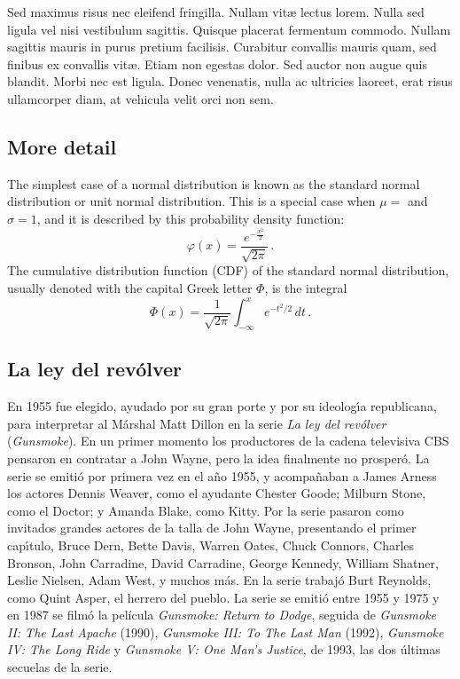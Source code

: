 \documentclass[11pt]{article}
\begin{document}
Sed maximus risus nec eleifend fringilla. Nullam vit{\ae} lectus lorem. Nulla sed ligula vel nisi vestibulum sagittis. Quisque placerat fermentum commodo. Nullam sagittis mauris in purus pretium facilisis. Curabitur convallis mauris quam, sed finibus ex convallis vit{\ae}. Etiam non egestas dolor. Sed auctor non augue quis blandit. Morbi nec est ligula. Donec venenatis, nulla ac ultricies laoreet, erat risus ullamcorper diam, at vehicula velit orci non sem.

\subsection{More detail}

The simplest case of a normal distribution is known as the standard normal distribution or unit normal distribution. This is a special case when $\mu =$  and $\sigma = 1$, and it is described by this probability density function:
$$
    \varphi( x ) = \frac{
     \displaystyle e^{- \frac{ x^2}{2}}
     }{
      \displaystyle \sqrt{2 \pi}
     }\, .
$$
The cumulative distribution function (CDF) of the standard normal distribution, usually denoted with the capital Greek letter $\Phi$, is the integral
$$
 \Phi(x) = \frac{1}{\sqrt{2\pi}} \int_{-\infty}^x \! e^{-t^2\!/2}\, dt\, .
$$

\subsection{La ley del rev\'{o}lver}
 
En 1955 fue elegido, ayudado por su gran porte y por su ideolog\'{\i}a republicana, para interpretar al M\'{a}rshal Matt Dillon en la serie \textit{La ley del rev\'{o}lver} (\textit{Gunsmoke}).
En un primer momento los productores de la cadena televisiva CBS pensaron en contratar a John Wayne, pero la idea finalmente no prosper\'{o}. La serie se emiti\'{o} por primera vez en el a\~{n}o 1955, y acompa\~{n}aban a James Arness los actores Dennis Weaver, como el ayudante Chester Goode; Milburn Stone, como el Doctor; y Amanda Blake, como Kitty. Por la serie pasaron como invitados grandes actores de la talla de John Wayne, presentando el primer cap\'{\i}tulo, Bruce Dern, Bette Davis, Warren Oates, Chuck Connors, Charles Bronson, John Carradine, David Carradine, George Kennedy, William Shatner, Leslie Nielsen, Adam West, y muchos m\'{a}s.
En la serie trabaj\'{o} Burt Reynolds, como Quint Asper, el herrero del pueblo.
La serie se emiti\'{o} entre 1955 y 1975 y en 1987 se film\'{o} la película \textit{Gunsmoke: Return to Dodge}, seguida de \textit{Gunsmoke II: The Last Apache} (1990), \textit{Gunsmoke III: To The Last Man} (1992), \textit{Gunsmoke IV: The Long Ride} y \textit{Gunsmoke V: One Man's Justice}, de 1993, las dos \'{u}ltimas secuelas de la serie. 
\end{document}

